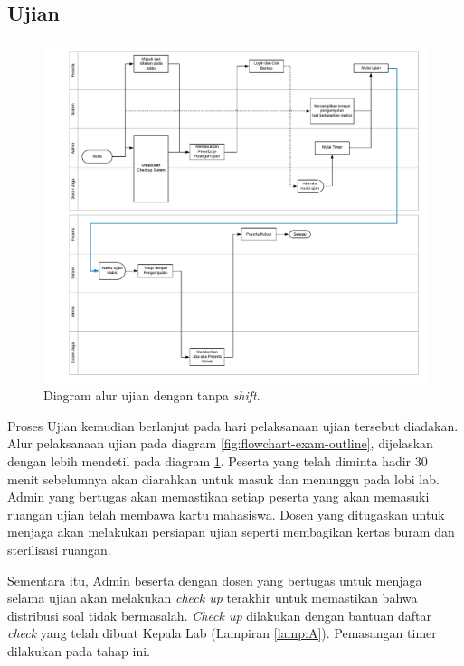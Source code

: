     \subsection{Ujian}
        \begin{figure}
            \centering
            \includegraphics[height=0.8\paperwidth]{Gambar/flowchart/exam-flow-ujian-no-shift.pdf}
            \caption{Diagram alur ujian dengan tanpa \textit{shift}.}
            \label{fig:flowchart-exam-exam-noshift}
        \end{figure}
        Proses Ujian kemudian berlanjut pada hari pelaksanaan ujian tersebut
        diadakan. Alur pelaksanaan ujian pada diagram
        \ref{fig:flowchart-exam-outline}, dijelaskan dengan lebih mendetil pada
        diagram \ref{fig:flowchart-exam-exam-noshift}. Peserta yang telah
        diminta hadir 30 menit sebelumnya akan diarahkan untuk masuk dan
        menunggu pada lobi lab. Admin yang bertugas akan memastikan setiap
        peserta yang akan memasuki ruangan ujian telah membawa kartu mahasiswa.
        Dosen yang ditugaskan untuk menjaga akan melakukan persiapan ujian seperti
        membagikan kertas buram dan sterilisasi ruangan.
        
        Sementara itu, Admin beserta dengan dosen yang bertugas untuk menjaga
        selama ujian akan melakukan \textit{check up} terakhir untuk memastikan
        bahwa distribusi soal tidak bermasalah. \textit{Check up} dilakukan
        dengan bantuan daftar \textit{check} yang telah dibuat Kepala Lab (Lampiran
        \ref{lamp:A}). Pemasangan timer dilakukan pada tahap ini.
        
